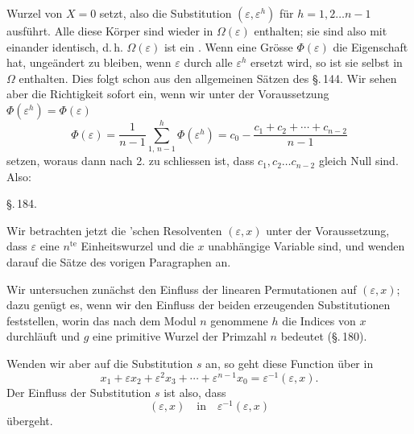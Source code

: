 Wurzel von $X = 0$ setzt, also die Substitution $(\varepsilon, \varepsilon^h)$ für $h = 1, 2 \ldots n-1$ ausführt. Alle diese Körper sind wieder in $\Omega(\varepsilon)$ enthalten; sie sind also mit einander identisch, d.\,h. $\Omega(\varepsilon)$ ist ein . Wenn eine Grösse $\Phi(\varepsilon)$ die Eigenschaft hat, ungeändert zu bleiben, wenn $\varepsilon$ durch alle $\varepsilon^h$ ersetzt wird, so ist sie selbst in $\Omega$ enthalten. Dies folgt schon aus den allgemeinen Sätzen des \S.\,144. Wir sehen aber die Richtigkeit sofort ein, wenn wir unter der Voraussetzung $\Phi(\varepsilon^h) = \Phi(\varepsilon)$
\[
\Phi(\varepsilon) = \frac{1}{n-1}\sum_{1,\,n-1}^{h}\Phi(\varepsilon^h) = c_0 - \frac{c_1 + c_2 + \cdots + c_{n-2}}{n-1}
\]
setzen, woraus dann nach 2. zu schliessen ist, dass $c_1, c_2 \ldots c_{n-2}$ gleich Null sind. Also:


\begin{center}
\S.\,184.

\end{center}

Wir betrachten jetzt die 'schen Resolventen $(\varepsilon, x)$ unter der Voraussetzung, dass $\varepsilon$ eine  $n^{\text{te}}$ Einheitswurzel und die $x$ unabhängige Variable sind, und wenden darauf die Sätze des vorigen Paragraphen an.

Wir untersuchen zunächst den Einfluss der linearen Permutationen auf $(\varepsilon, x)$; dazu genügt es, wenn wir den Einfluss der beiden erzeugenden Substitutionen
feststellen, worin das nach dem Modul $n$ genommene $h$ die Indices von $x$ durchläuft und $g$ eine primitive Wurzel der Primzahl $n$ bedeutet (\S.\,180).

Wenden wir aber auf
die Substitution $s$ an, so geht diese Function über in
\[
x_1 + \varepsilon x_2 + \varepsilon^2 x_3 + \cdots + \varepsilon^{n-1}x_0 = \varepsilon^{-1}(\varepsilon, x).
\]
Der Einfluss der Substitution $s$ ist also, dass
\[
(\varepsilon, x) \quad \text{in} \quad \varepsilon^{-1}(\varepsilon, x)
\]
übergeht.
